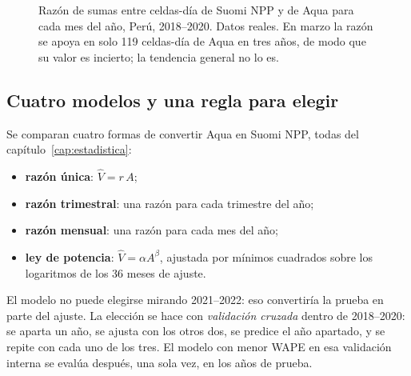 \begin{figure}[!htbp]
\centering
{}
\caption{Razón de sumas entre celdas-día de Suomi NPP y de Aqua para cada mes del año, Perú,
2018--2020. Datos reales. En marzo la razón se apoya en solo 119 celdas-día de Aqua en tres
años, de modo que su valor es incierto; la tendencia general no lo es.}
\label{fig:peru-razon-mensual}
\end{figure}

\subsection{Cuatro modelos y una regla para elegir}

Se comparan cuatro formas de convertir Aqua en Suomi NPP, todas del
capítulo~\ref{cap:estadistica}:

\begin{itemize}
  \item \textbf{razón única}: $\widehat V = r\,A$;
  \item \textbf{razón trimestral}: una razón para cada trimestre del año;
  \item \textbf{razón mensual}: una razón para cada mes del año;
  \item \textbf{ley de potencia}: $\widehat V = \alpha A^{\beta}$, ajustada por mínimos
  cuadrados sobre los logaritmos de los 36 meses de ajuste.
\end{itemize}

El modelo no puede elegirse mirando 2021--2022: eso convertiría la prueba en parte del
ajuste. La elección se hace con \emph{validación cruzada} dentro de 2018--2020: se aparta
un año, se ajusta con los otros dos, se predice el año apartado, y se repite con cada
uno de los tres. El modelo con menor WAPE en esa validación interna se evalúa después,
una sola vez, en los años de prueba.

